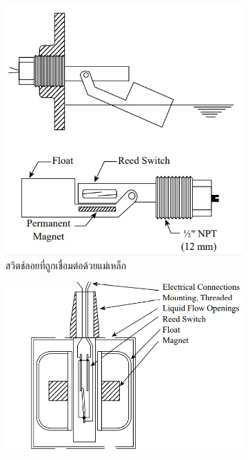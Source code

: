 \documentclass[final,11pt,a4paper]{article}
\begin{document}
\begin{figure}
    \begin{subfigure}[b]{0.33\textwidth}
        \centering
        \includegraphics[width=\textwidth]{images/Screenshot_1.jpg}
        \caption{สวิตช์ลอยที่ถูกเชื่อมต่อด้วยแม่เหล็ก}
        \label{fig:mcfs1}
    \end{subfigure}
    \hfill
    \begin{subfigure}[b]{0.4\textwidth}
        \centering
        \includegraphics[width=\textwidth]{images/Screenshot_2.jpg}

\end{subfigure}
\end{figure}
\end{document}
